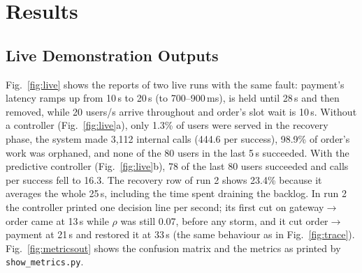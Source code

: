 \documentclass[conference,a4paper]{IEEEtran}
\begin{document}
\section{Results}
\label{sec:exp}

\subsection{Live Demonstration Outputs}
Fig.~\ref{fig:live} shows the reports of two live runs with the same fault: payment's latency ramps up from 10\,s to 20\,s (to 700--900\,ms), is held until 28\,s and then removed, while 20 users/s arrive throughout and order's slot wait is 10\,s. Without a controller (Fig.~\ref{fig:live}a), only 1.3\% of users were served in the recovery phase, the system made 3,112 internal calls (444.6 per success), 98.9\% of order's work was orphaned, and none of the 80 users in the last 5\,s succeeded. With the predictive controller (Fig.~\ref{fig:live}b), 78 of the last 80 users succeeded and calls per success fell to 16.3. The recovery row of run 2 shows 23.4\% because it averages the whole 25\,s, including the time spent draining the backlog. In run 2 the controller printed one decision line per second; its first cut on gateway$\to$order came at 13\,s while $\rho$ was still 0.07, before any storm, and it cut order$\to$payment at 21\,s and restored it at 33\,s (the same behaviour as in Fig.~\ref{fig:trace}). Fig.~\ref{fig:metricsout} shows the confusion matrix and the metrics as printed by \texttt{show\_metrics.py}.
\end{document}

